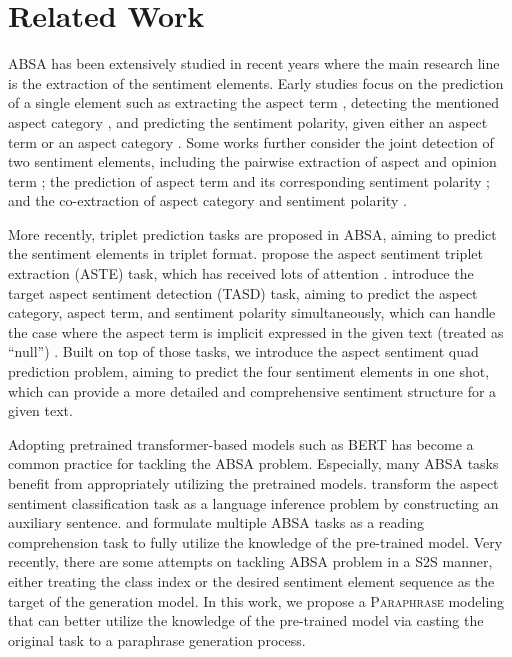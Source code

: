 \documentclass[11pt]{article}
\begin{document}
\section{Related Work}
ABSA has been extensively studied in recent years where the main research line is the extraction of the sentiment elements. 
Early studies focus on the prediction of a single element such as extracting the aspect term \cite{emnlp15-ate, ijcai16-ate, acl18-ate-xuhu, acl19-s2s-ate}, detecting the mentioned aspect category \cite{aaai15-acp, naacl21-asap}, and predicting the sentiment polarity, given either an aspect term \cite{emnlp16-asc, emnlp18-asc, emnlp20-asc} or an aspect category \cite{emnlp16-ruder-asc-category, emnlp19-asc-category}.
Some works further consider the joint detection of two sentiment elements, including the pairwise extraction of aspect and opinion term \cite{aaai17-cmla, acl20-aope, acl20-spanmlt}; the prediction of aspect term and its corresponding sentiment polarity \cite{aaai19-lx-e2e-tbsa, acl19-ruidan, acl19-span, acl19-luo-doer, acl20-racl}; and the co-extraction of aspect category and sentiment polarity \cite{coling20-acsa}.

More recently, triplet prediction tasks are proposed in ABSA, aiming to predict the sentiment elements in triplet format. \citet{aaai20-robin} propose the aspect sentiment triplet extraction (ASTE) task, which has received lots of attention \cite{emnlp20-xulu, arxiv-two-stage-aste, aaai21-uabsa, aaai21-mrc-aste-2}. \citet{aaai20-tasd} introduce the target aspect sentiment detection (TASD) task, aiming to predict the aspect category, aspect term, and sentiment polarity simultaneously, which can handle the case where the aspect term is implicit expressed in the given text (treated as ``null'') 
\cite{kbs21-mejd-tasd}.
Built on top of those tasks, we introduce the aspect sentiment quad prediction problem, aiming to predict the four sentiment elements in one shot, which can provide a more detailed and comprehensive sentiment structure for a given text.

Adopting pretrained transformer-based models such as BERT \cite{bert} has become a common practice for tackling the ABSA problem. Especially, many ABSA tasks benefit from appropriately utilizing the pretrained models. \citet{naacl19-sunchi} transform the aspect sentiment classification task as a language inference problem by constructing an auxiliary sentence. \citet{aaai21-mrc-aste-2} and \citet{aaai21-uabsa} formulate multiple ABSA tasks as a reading comprehension task to fully utilize the knowledge of the pre-trained model. Very recently, there are some attempts on tackling ABSA problem in a S2S manner, either treating the class index \cite{acl21-qxp} or the desired sentiment element sequence \cite{acl21-gabsa} as the target of the generation model. In this work, we propose a \textsc{Paraphrase} modeling that can better utilize the knowledge of the pre-trained model via casting the original task to a paraphrase generation process.
\end{document}
